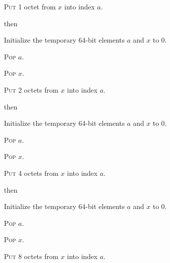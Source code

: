 \documentclass[a4paper,12pt]{article}
\newcommand{\num}[1]{\texttt{\MakeLowercase{#1}}}
\newcommand{\hex}[1]{\num{#1}_{\textup{\tiny 16}}}
\newcommand{\proc}[1]{\textsc{#1}}
\newcommand{\op}[1]{$#1$}
\theoremstyle{definition}
\newcommand{\STORES}    [1]{\op{\hex{15}}}
\newcommand{\STOREI}    [1]{\op{\hex{16}}}
\newcommand{\STOREL}    [1]{\op{\hex{17}}}
\begin{document}
\begin{stepnumbers}[start=3]
\begin{description}
\begin{stepnumbers}
    \item \proc{Put} 1 octet from $x$ into index $a$.
    \end{stepnumbers}
  \item[\STORES{}] then
    \begin{stepnumbers}
    \item Initialize the temporary 64-bit elements $a$ and $x$ to 0.
    \item \proc{Pop} $a$.
    \item \proc{Pop} $x$.
    \item \proc{Put} 2 octets from $x$ into index $a$.
    \end{stepnumbers}
  \item[\STOREI{}] then
    \begin{stepnumbers}
    \item Initialize the temporary 64-bit elements $a$ and $x$ to 0.
    \item \proc{Pop} $a$.
    \item \proc{Pop} $x$.
    \item \proc{Put} 4 octets from $x$ into index $a$.
    \end{stepnumbers}
  \item[\STOREL{}] then
    \begin{stepnumbers}
    \item Initialize the temporary 64-bit elements $a$ and $x$ to 0.
    \item \proc{Pop} $a$.
    \item \proc{Pop} $x$.
    \item \proc{Put} 8 octets from $x$ into index $a$.
    \end{stepnumbers}
  \end{description}
\end{stepnumbers}
\end{document}
